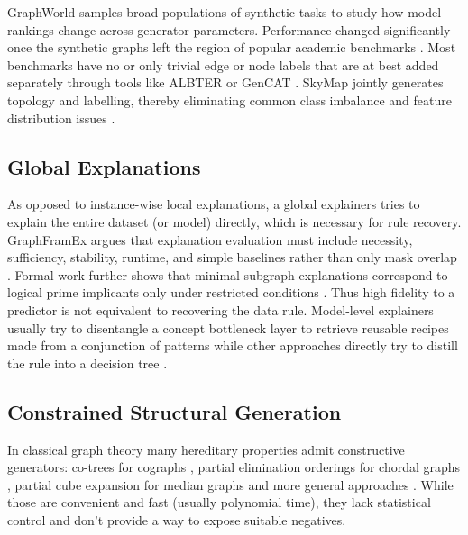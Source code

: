 \documentclass[11pt,twocolumn]{article}
\begin{document}
GraphWorld samples broad populations of synthetic tasks to study how model rankings change across generator parameters. Performance changed significantly once the synthetic graphs left the region of popular academic benchmarks \cite{palowitchGraphWorldFakeGraphs2022}.
Most benchmarks have no or only trivial edge or node labels that are at best added separately through tools like ALBTER \cite{TODO} or GenCAT \cite{maekawaGenCATGeneratingAttributed2023}.
SkyMap jointly generates topology and labelling, thereby eliminating common class imbalance and feature distribution issues \cite{wassingtonSkyMapGenerativeGraph2024}.



\subsection{Global Explanations}

As opposed to instance-wise local explanations, a global explainers tries to explain the entire dataset (or model) directly, which is necessary for rule recovery.
GraphFramEx argues that explanation evaluation must include necessity, sufficiency, stability, runtime, and simple baselines rather than only mask overlap \cite{amaraGraphFramExSystematicEvaluation2024}.
Formal work further shows that minimal subgraph explanations correspond to logical prime implicants only under restricted conditions \cite{weinbauerPrimeImplicantExplanations2025}.
Thus high fidelity to a predictor is not equivalent to recovering the data rule. 
Model-level explainers usually try to disentangle a concept bottleneck layer to retrieve reusable recipes made from a conjunction of patterns \cite{azzolinGlobalExplainabilityGNNs2023, armgaanGRAPHTRAILTranslatingGNN, gengLogicXGNNGroundedLogical2026, ragnoLogicbasedSelfExplainableGraph2025} while other approaches directly try to distill the rule into a decision tree \cite{mullerGraphChefLearningRecipe, pluskaLogicalDistillationGraph2024}.

\subsection{Constrained Structural Generation}

In classical graph theory many hereditary properties admit constructive generators: co-trees for cographs \cite{TODO}, partial elimination orderings for chordal graphs \cite{TODO}, partial cube expansion for median graphs \cite{ovchinnikovPartialCubesStructures2008} and more general approaches \cite{iordanskiConstructiveGraphTheory2020}.
While those are convenient and fast (usually polynomial time), they lack statistical control and don't provide a way to expose suitable negatives.
\end{document}
